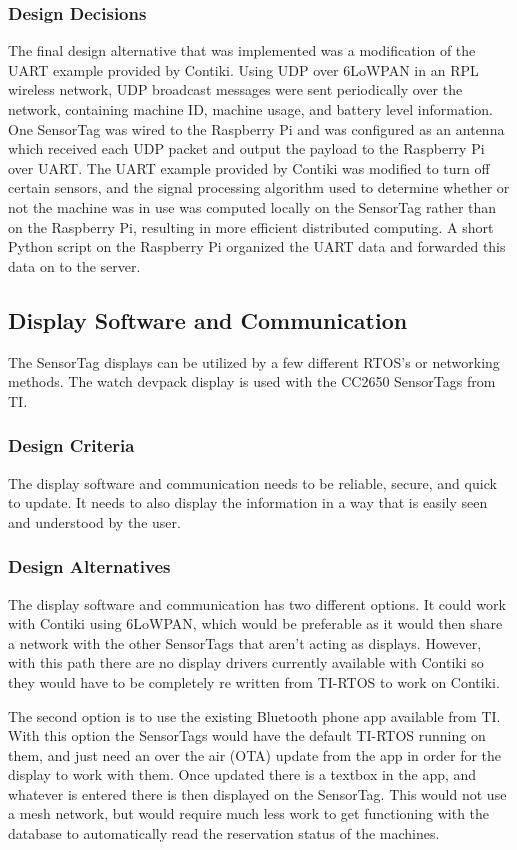 \documentclass[PPFS.tex]{template/subfiles}
\begin{document}
\subsubsection{Design Decisions}
The final design alternative that was implemented was a modification of the UART example provided by Contiki. Using UDP over 6LoWPAN in an RPL wireless network, UDP broadcast messages were sent periodically over the network, containing machine ID, machine usage, and battery level information. One SensorTag was wired to the Raspberry Pi and was configured as an antenna which received each UDP packet and output the payload to the Raspberry Pi over UART. The UART example provided by Contiki was modified to turn off certain sensors, and the signal processing algorithm used to determine whether or not the machine was in use was computed locally on the SensorTag rather than on the Raspberry Pi, resulting in more efficient distributed computing. A short Python script on the Raspberry Pi organized the UART data and forwarded this data on to the server.

\subsection{Display Software and Communication}
The SensorTag displays can be utilized by a few different RTOS's or networking methods. The watch devpack display is used with the CC2650 SensorTags from TI. 

\subsubsection{Design Criteria}
The display software and communication needs to be reliable, secure, and quick to update. It needs to also display the information in a way that is easily seen and understood by the user. 

\subsubsection{Design Alternatives}
The display software and communication has two different options. It could work with Contiki using 6LoWPAN, which would be preferable as it would then share a network with the other SensorTags that aren't acting as displays. However, with this path there are no display drivers currently available with Contiki so they would have to be completely re written from TI-RTOS to work on Contiki. 

The second option is to use the existing Bluetooth phone app available from TI. With this option the SensorTags would have the default TI-RTOS running on them, and just need an over the air (OTA) update from the app in order for the display to work with them. Once updated there is a textbox in the app, and whatever is entered there is then displayed on the SensorTag. This would not use a mesh network, but would require much less work to get functioning with the database to automatically read the reservation status of the machines.
\end{document}
